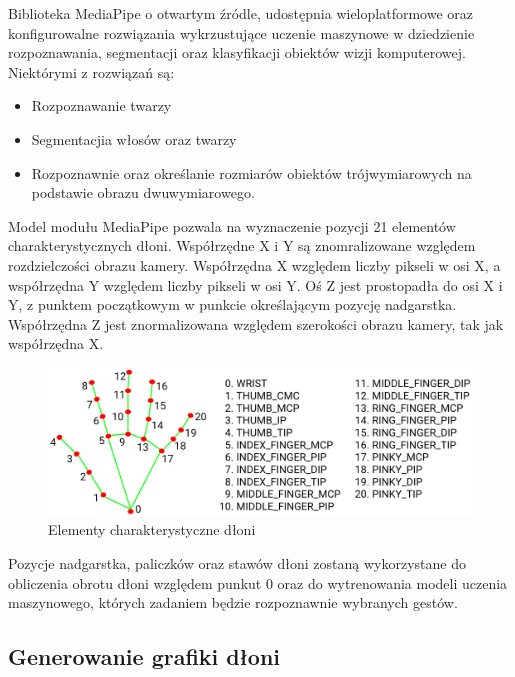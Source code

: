     \quad Biblioteka MediaPipe o otwartym źródle, udostępnia wieloplatformowe oraz konfigurowalne rozwiązania wykrzustujące uczenie maszynowe w dziedzienie rozpoznawania, segmentacji oraz klasyfikacji obiektów wizji komputerowej. Niektórymi z rozwiązań są:
    
    \begin{itemize}
        \item Rozpoznawanie twarzy
        \item Segmentacjia włosów oraz twarzy
        \item Rozpoznawnie oraz określanie rozmiarów obiektów trójwymiarowych 
              na podstawie obrazu dwuwymiarowego. 
    \end{itemize}
    
    \quad Model modułu MediaPipe pozwala na wyznaczenie pozycji 21 elementów charakterystycznych dłoni. Współrzędne X i Y są znomralizowane względem rozdzielczości obrazu kamery. Współrzędna X względem liczby pikseli w osi X, a współrzędna Y względem liczby pikseli w osi Y. Oś Z jest prostopadła do osi X i Y, z punktem początkowym w punkcie określającym pozycję nadgarstka. Współrzędna Z jest znormalizowana względem szerokości obrazu kamery, tak jak współrzędna X. 
    
    \begin{figure}[H]
    \begin{center}
        \includegraphics[width=15cm]{../images/hand_landmarks.png}
        \caption{Elementy charakterystyczne dłoni}
    \end{center}
    \end{figure}
    
    \quad Pozycje nadgarstka, paliczków oraz stawów dłoni zostaną wykorzystane do obliczenia obrotu dłoni względem punkut 0 oraz do wytrenowania modeli uczenia maszynowego, których zadaniem będzie rozpoznawnie wybranych gestów. 
    
    \subsection{Generowanie grafiki dłoni}
    
